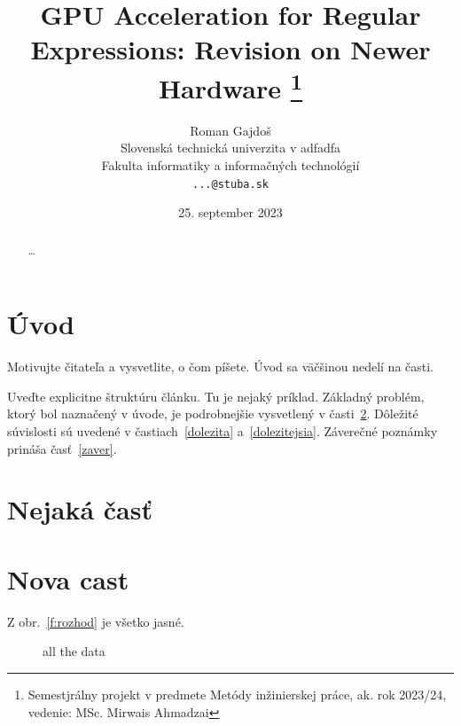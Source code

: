 \documentclass[10pt,twocolumn,twoside,slovak,a4paper]{article}
\title{GPU Acceleration for Regular Expressions: Revision on Newer Hardware
\thanks{Semestjrálny projekt v predmete Metódy inžinierskej práce, ak. rok 2023/24, vedenie: MSc. Mirwais Ahmadzai}} %
\author{Roman Gajdoš\\[2pt]
	{\small Slovenská technická univerzita v adfadfa}\\
	{\small Fakulta informatiky a informačných technológií}\\
	{\small \texttt{...@stuba.sk}}
	}
\date{\small 25. september 2023} %
\begin{document}
\maketitle

\begin{abstract}
	\ldots
\end{abstract}



\section{Úvod}

Motivujte čitateľa a vysvetlite, o čom píšete. Úvod sa väčšinou nedelí na časti.

Uveďte explicitne štruktúru článku. Tu je nejaký príklad.
Základný problém, ktorý bol naznačený v úvode, je podrobnejšie vysvetlený v časti~\ref{nejaka}.
Dôležité súvislosti sú uvedené v častiach~\ref{dolezita} a~\ref{dolezitejsia}.
Záverečné poznámky prináša časť~\ref{zaver}.



\section{Nejaká časť} \label{nejaka}
\section{Nova cast} \label{nejaky label}
Z obr.~\ref{f:rozhod} je všetko jasné.



\begin{figure}[htp]
	\centering
	\hfill%
	\caption{all the data}
\end{figure}
\end{document}

